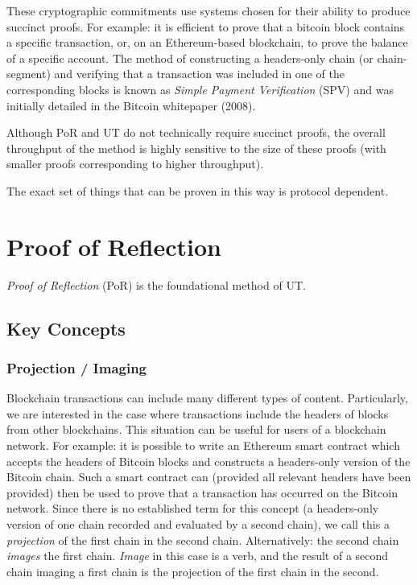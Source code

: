\documentclass[a4paper,]{article}
\begin{document}
These cryptographic commitments use systems chosen for their ability to produce succinct proofs.
For example: it is efficient to prove that a bitcoin block contains a specific transaction, or, on an Ethereum-based blockchain, to prove the balance of a specific account.
The method of constructing a headers-only chain (or chain-segment) and verifying that a transaction was included in one of the corresponding blocks is known as \emph{Simple Payment Verification} (SPV) and was initially detailed in the Bitcoin whitepaper (2008).

Although PoR and UT do not technically require succinct proofs, the overall throughput of the method is highly sensitive to the size of these proofs (with smaller proofs corresponding to higher throughput).

The exact set of things that can be proven in this way is protocol dependent.

\section{Proof of Reflection}

\emph{Proof of Reflection} (PoR) is the foundational method of UT.

\subsection{Key Concepts}

\subsubsection{Projection / Imaging}

Blockchain transactions can include many different types of content.
Particularly, we are interested in the case where transactions include the headers of blocks from other blockchains.
This situation can be useful for users of a blockchain network.
For example: it is possible to write an Ethereum smart contract which accepts the headers of Bitcoin blocks and constructs a headers-only version of the Bitcoin chain.
Such a smart contract can (provided all relevant headers have been provided) then be used to prove that a transaction has occurred on the Bitcoin network.
Since there is no established term for this concept (a headers-only version of one chain recorded and evaluated by a second chain), we call this a \emph{projection} of the first chain in the second chain.
Alternatively: the second chain \emph{images} the first chain.
\emph{Image} in this case is a verb, and the result of a second chain imaging a first chain is the projection of the first chain in the second.
\end{document}
